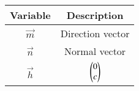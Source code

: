 \begin{tabular}[12pt]{ |c| c|}
    \hline
    \textbf{Variable} & \textbf{Description}\\ 
    \hline
	$\vec{m}$ & Direction vector\\
    \hline
	$\vec{n}$ & Normal vector\\
	\hline
	$\vec{h}$ & $\begin{pmatrix}0\\c\end{pmatrix}$\\
	\hline
    \end{tabular}
